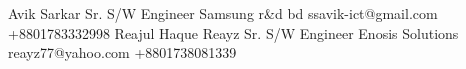 
\begin{referees}
		{Avik Sarkar}
		{Sr. S/W Engineer}
		{Samsung r\&d bd}
		{ssavik-ict@gmail.com}
		{+8801783332998}
		{Reajul Haque Reayz}
		{Sr. S/W Engineer}
		{Enosis Solutions}
		{reayz77@yahoo.com}
		{+8801738081339}
\end{referees}